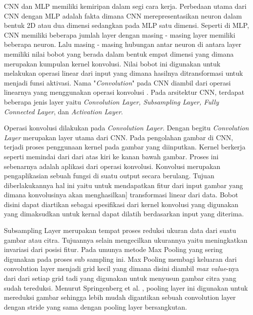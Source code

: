 \par CNN dan MLP memiliki kemiripan dalam segi cara kerja. Perbedaan utama dari CNN dengan MLP adalah fakta
dimana CNN merepresentasikan neuron dalam bentuk 2D atau dua dimensi sedangkan pada MLP satu dimensi.
Seperti di MLP, CNN memiliki beberapa jumlah layer dengan masing - masing layer memiliki beberapa neuron.
Lalu masing - masing hubungan antar neuron di antara layer memiliki nilai bobot yang berada dalam bentuk empat dimensi
yang dimana merupakan kumpulan kernel konvolusi. Nilai bobot ini digunakan untuk melakukan operasi linear 
dari input yang dimana hasilnya ditransformasi untuk menjadi funsi aktivasi. Nama "\emph{Convolution}" pada 
CNN diambil dari operasi linearnya yang menggunakan operasi konvolusi \cite{putra2016klasifikasi}.
Pada arsitektur CNN, terdapat beberapa jenis layer yaitu \emph{Convolution Layer, Subsampling Layer, 
Fully Connected Layer}, dan \emph{Activation Layer}.

\par Operasi konvolusi dilakukan pada \emph{Convolution Layer}. Dengan begitu \emph{Convolution Layer} merupakan
layer utama dari CNN. Pada pengolahan gambar di CNN, terjadi proses penggunaan kernel pada gambar yang diinputkan.
Kernel berkerja seperti memindai dari dari atas kiri ke kanan bawah gambar. Proses ini sebenarnya adalah aplikasi 
dari operasi konvolusi. Konvolusi merupakan pengaplikasian sebuah fungsi di suatu output secara berulang. Tujuan
diberlakukannya hal ini yaitu untuk mendapatkan fitur dari input gambar yang dimana konvolusinya akan menghasilkan]
transformasi linear dari data. Bobot disini dapat diartikan sebagai spesifikasi dari kernel konvolusi yang digunakan yang
dimaksudkan untuk kernal dapat dilatih berdasarkan input yang diterima.

\par Subsampling Layer merupakan tempat proses reduksi ukuran data dari suatu gambar atau citra. Tujuannya selain mengecilkan
ukurannya yaitu meningkatkan invariasi dari posisi fitur. Pada umunya metode Max Pooling yang sering digunakan pada proses sub sampling ini.
Max Pooling membagi keluaran dari convolution layer menjadi grid kecil yang dimana disini diambil \emph{max value}-nya dari dari setiap grid
tadi yang digunakan untuk menyusun gambar citra yang sudah tereduksi. Menurut Springenberg et al. \cite{springenberg2014striving}, pooling layer ini digunakan
untuk mereduksi gambar sehingga lebih mudah digantikan sebuah convolution layer dengan stride yang sama dengan pooling layer
bersangkutan\cite{putra2016klasifikasi}.

